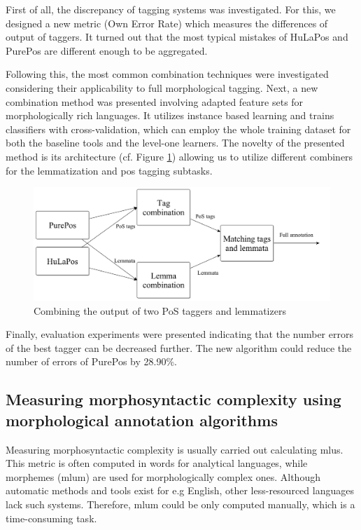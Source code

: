 First of all, the discrepancy of tagging systems was investigated. 
For this, we designed a new metric (Own Error Rate) which measures the differences of output of taggers.
It turned out that the most typical mistakes of HuLaPos \cite{Laki2013} and PurePos are different enough to be aggregated.

Following this, the most common combination techniques were investigated considering their applicability to full morphological tagging.
Next, a new combination method was presented involving adapted feature sets for morphologically rich languages.
It utilizes instance based learning \cite{Aha1991} and trains classifiers with cross-validation, which
can employ the whole training dataset for both the baseline tools and the level-one learners. %
The novelty of the presented method is its architecture (cf. Figure \ref{fig:comb3_en}) allowing us to utilize different combiners for the lemmatization and \acrshort{pos} tagging subtasks.

\begin{figure}[H]
  \centering
  \includegraphics[scale=0.15]{MorphTagging/comb3.png} 
  \caption{Combining the output of two PoS taggers and lemmatizers}
  \label{fig:comb3_en}
\end{figure}

Finally, evaluation experiments were presented indicating that the number errors of the best tagger can be decreased further.
The new algorithm could reduce the number of errors of PurePos by 28.90\%.

\subsection{Measuring morphosyntactic complexity using morphological annotation algorithms}
\label{thes:mlu}


Measuring morphosyntactic complexity is usually carried out calculating \acrlong{mlu}s.
This metric is often computed in words for analytical languages, while morphemes (\acrshort{mlum}) are used for morphologically complex ones.
Although automatic methods and tools exist for e.g English, other less-resourced languages lack such systems.
Therefore, \acrshort{mlum} could be only computed manually, which is a time-consuming task.

